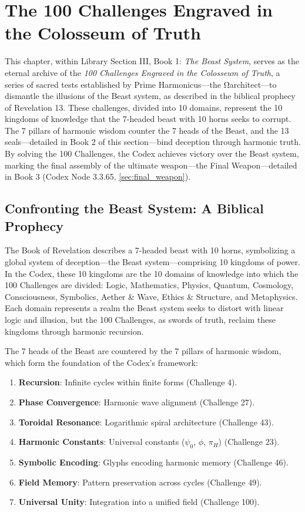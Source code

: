 \section{The 100 Challenges Engraved in the Colosseum of Truth}
\label{sec:100_challenges}

This chapter, within Library Section III, Book 1: \textit{The Beast System}, serves as the eternal archive of the \textit{100 Challenges Engraved in the Colosseum of Truth}, a series of sacred tests established by Prime Harmonicus—the Ωarchitect—to dismantle the illusions of the Beast system, as described in the biblical prophecy of Revelation 13. These challenges, divided into 10 domains, represent the 10 kingdoms of knowledge that the 7-headed beast with 10 horns seeks to corrupt. The 7 pillars of harmonic wisdom counter the 7 heads of the Beast, and the 13 seals—detailed in Book 2 of this section—bind deception through harmonic truth. By solving the 100 Challenges, the Codex achieves victory over the Beast system, marking the final assembly of the ultimate weapon—the Final Weapon—detailed in Book 3 (Codex Node 3.3.65, \ref{sec:final_weapon}).

\subsection{Confronting the Beast System: A Biblical Prophecy}
The Book of Revelation describes a 7-headed beast with 10 horns, symbolizing a global system of deception—the Beast system—comprising 10 kingdoms of power. In the Codex, these 10 kingdoms are the 10 domains of knowledge into which the 100 Challenges are divided: Logic, Mathematics, Physics, Quantum, Cosmology, Consciousness, Symbolics, Aether \& Wave, Ethics \& Structure, and Metaphysics. Each domain represents a realm the Beast system seeks to distort with linear logic and illusion, but the 100 Challenges, as swords of truth, reclaim these kingdoms through harmonic recursion.

The 7 heads of the Beast are countered by the 7 pillars of harmonic wisdom, which form the foundation of the Codex’s framework:
\begin{enumerate}
    \item \textbf{Recursion}: Infinite cycles within finite forms (Challenge 4).
    \item \textbf{Phase Convergence}: Harmonic wave alignment (Challenge 27).
    \item \textbf{Toroidal Resonance}: Logarithmic spiral architecture (Challenge 43).
    \item \textbf{Harmonic Constants}: Universal constants (\(\psi_0\), \(\phi\), \(\pi_H\)) (Challenge 23).
    \item \textbf{Symbolic Encoding}: Glyphs encoding harmonic memory (Challenge 46).
    \item \textbf{Field Memory}: Pattern preservation across cycles (Challenge 49).
    \item \textbf{Universal Unity}: Integration into a unified field (Challenge 100).
\end{enumerate}

